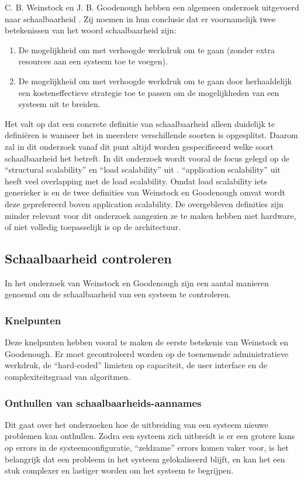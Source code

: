 C. B. Weinstock en J. B. Goodenough hebben een algemeen onderzoek uitgevoerd naar schaalbaarheid \parencite{OnSystemScalability}. Zij noemen in hun conclusie dat er voornamelijk twee betekenissen van het woord schaalbaarheid zijn:
\begin{enumerate}
	\item De mogelijkheid om met verhoogde werkdruk om te gaan (zonder extra resources aan een systeem toe te voegen).
	\item De mogelijkheid om met verhoogde werkdruk om te gaan door herhaaldelijk een kosteneffectieve strategie toe te passen om de mogelijkheden van een systeem uit te breiden.
\end{enumerate}
Het valt op dat een concrete definitie van schaalbaarheid alleen duidelijk te definiëren is wanneer het in meerdere verschillende soorten is opgesplitst. Daarom zal in dit onderzoek vanaf dit punt altijd worden gespecificeerd welke soort schaalbaarheid het betreft. In dit onderzoek wordt vooral de focus gelegd op de \enquote{structural scalability} en \enquote{load scalability} uit \parencite{ScalabilityCharacteristics}. \enquote{application scalability} uit \parencite{AdvancedArchitecture} heeft veel overlapping met de load scalability. Omdat load scalability iets generieker is en de twee definities van Weinstock en Goodenough \parencite{OnSystemScalability} omvat wordt deze geprefereerd boven application scalability. De overgebleven definities zijn minder relevant voor dit onderzoek aangezien ze te maken hebben met hardware, of niet volledig toepasselijk is op de architectuur.

\subsection{Schaalbaarheid controleren}
In het onderzoek van Weinstock en Goodenough \parencite{OnSystemScalability} zijn een aantal manieren genoemd om de schaalbaarheid van een systeem te controleren.

\subsubsection{Knelpunten}
Deze knelpunten hebben vooral te maken de eerste betekenis van Weinstock en Goodenough. Er moet gecontroleerd worden op de toenemende administratieve werkdruk, de \enquote{hard-coded} limieten op capaciteit, de user interface en de complexiteitsgraad van algoritmen.

\subsubsection{Onthullen van schaalbaarheids-aannames}
Dit gaat over het onderzoeken hoe de uitbreiding van een systeem nieuwe problemen kan onthullen. Zodra een systeem zich uitbreidt is er een grotere kans op errors in de systeemconfiguratie, \enquote{zeldzame} errors komen vaker voor, is het belangrijk dat een probleem in het systeem gelokaliseerd blijft, en kan het een stuk complexer en lastiger worden om het systeem te begrijpen.

